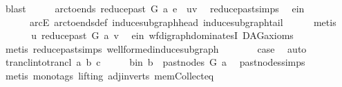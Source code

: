 \begin{isabellebody}
\ blast\isanewline
\ \ \isamarkupfalse%
\ \isamarkupfalse%
\ {\isachardoublequoteopen}arc{\isacharunderscore}{\kern0pt}to{\isacharunderscore}{\kern0pt}ends\ {\isacharparenleft}{\kern0pt}reduce{\isacharunderscore}{\kern0pt}past\ G\ a{\isacharparenright}{\kern0pt}\ e\ {\isacharequal}{\kern0pt}\ {\isacharparenleft}{\kern0pt}u{\isacharcomma}{\kern0pt}v{\isacharparenright}{\kern0pt}{\isachardoublequoteclose}\ \isamarkupfalse%
\ reduce{\isacharunderscore}{\kern0pt}past{\isachardot}{\kern0pt}simps\ \isamarkupfalse%
\ e{\isacharunderscore}{\kern0pt}in\isanewline
\ \ \ \ \ \ arcE\ arc{\isacharunderscore}{\kern0pt}to{\isacharunderscore}{\kern0pt}ends{\isacharunderscore}{\kern0pt}def\ induce{\isacharunderscore}{\kern0pt}subgraph{\isacharunderscore}{\kern0pt}head\ induce{\isacharunderscore}{\kern0pt}subgraph{\isacharunderscore}{\kern0pt}tail\isanewline
\ \ \ \ \isamarkupfalse%
\ metis\ \ \isanewline
\isanewline
\ \ \isamarkupfalse%
\ \isamarkupfalse%
\ \ {\isachardoublequoteopen}u\ {\isasymrightarrow}\isactrlbsub reduce{\isacharunderscore}{\kern0pt}past\ G\ a\isactrlesub \ v{\isachardoublequoteclose}\ \isamarkupfalse%
\ e{\isacharunderscore}{\kern0pt}in{}\ wf{\isacharunderscore}{\kern0pt}digraph{\isachardot}{\kern0pt}dominatesI\ DAG{\isacharunderscore}{\kern0pt}axioms\isanewline
\ \ \ \ \isamarkupfalse%
\ {\isacharparenleft}{\kern0pt}metis\ reduce{\isacharunderscore}{\kern0pt}past{\isachardot}{\kern0pt}simps\ wellformed{\isacharunderscore}{\kern0pt}induce{\isacharunderscore}{\kern0pt}subgraph{\isacharparenright}{\kern0pt}\ \ \isanewline
\ \ \isamarkupfalse%
\ \isamarkupfalse%
\ {\isacharquery}{\kern0pt}case\ \isamarkupfalse%
\ auto\isanewline
{}\isamarkupfalse%
\isanewline
\ \ \isamarkupfalse%
\ {\isacharparenleft}{\kern0pt}trancl{\isacharunderscore}{\kern0pt}into{\isacharunderscore}{\kern0pt}trancl\ a{}\ b\ c{\isacharparenright}{\kern0pt}\isanewline
\ \ \isamarkupfalse%
\ \isamarkupfalse%
\ b{\isacharunderscore}{\kern0pt}in{\isacharcolon}{\kern0pt}\ {\isachardoublequoteopen}b\ {\isasymin}\ past{\isacharunderscore}{\kern0pt}nodes\ G\ a{\isachardoublequoteclose}\ \isamarkupfalse%
\ past{\isacharunderscore}{\kern0pt}nodes{\isachardot}{\kern0pt}simps\ \isanewline
\ \ \ \ \isamarkupfalse%
\ {\isacharparenleft}{\kern0pt}metis\ {\isacharparenleft}{\kern0pt}mono{\isacharunderscore}{\kern0pt}tags{\isacharcomma}{\kern0pt}\ lifting{\isacharparenright}{\kern0pt}\ adj{\isacharunderscore}{\kern0pt}in{\isacharunderscore}{\kern0pt}verts{\isacharparenleft}{\kern0pt}{}{\isacharparenright}{\kern0pt}\ mem{\isacharunderscore}{\kern0pt}Collect{\isacharunderscore}{\kern0pt}eq\isanewline

\end{isabellebody}

